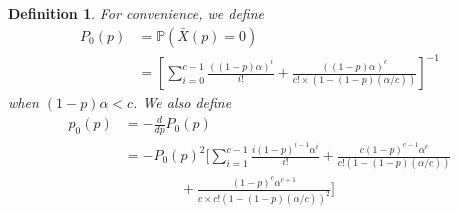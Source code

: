 \documentclass[conference]{IEEEtran}
\newtheorem{definition}{Definition}
\renewcommand{\P}{\mathbb{P}}
\begin{document}
\begin{definition}
  For convenience, we define 
  \begin{align}
    P_0(p) %
    &= \P(\bar X(p) = 0) \nonumber\\
    &= \left[\sum_{i=0}^{c -1} \frac{((1-p)\alpha)^i}{i!} + \frac{((1-p)\alpha)^c}{c! \times (1 - (1-p)(\alpha/c))}\right]^{-1}
  \end{align}
  when $(1 - p)\alpha < c$. We also define 
  \begin{align}
    p_0(p) %
    &= -\frac{d}{dp}P_0(p)\\
    &= -P_0(p)^2\Bigg[\sum_{i=1}^{c-1} \frac{i (1-p)^{i-1}\alpha^i}{i!} %
    + \frac{c(1-p)^{c-1}\alpha^c}{c!(1 - (1-p)(\alpha/c))} \nonumber\\
    &\quad\quad\quad\quad + \frac{(1-p)^c \alpha^{c+1}}{c\times c! (1 - (1-p)(\alpha/c))^2}\Bigg]\nonumber
  \end{align}
\end{definition}
\end{document}
